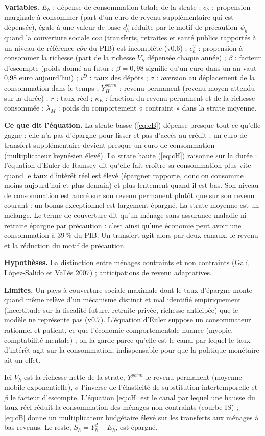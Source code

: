 \documentclass[11pt,a4paper]{article}
\newcommand{\variables}{\par\noindent\textbf{Variables.} }
\newcommand{\sens}{\par\noindent\textbf{Ce que dit l'équation.} }
\newcommand{\hyp}{\par\noindent\textbf{Hypothèses.} }
\newcommand{\limites}{\par\noindent\textbf{Limites.} }
\begin{document}
\begin{lecture}
\variables $E_h$ : dépense de consommation totale de la strate ; $c_h$ : propension marginale à consommer (part d'un euro de revenu supplémentaire qui est dépensée), égale à une valeur de base $c^0_h$ réduite par le motif de précaution $\psi_h$ quand la couverture sociale $cov$ (transferts, retraites et santé publics rapportés à un niveau de référence $\overline{cov}$ du PIB) est incomplète (v0.6) ; $c^V_h$ : propension à consommer la richesse (part de la richesse $V_h$ dépensée chaque année) ; $\beta$ : facteur d'escompte (poids donné au futur ; $\beta=0{,}98$ signifie qu'un euro dans un an vaut 0,98 euro aujourd'hui) ; $i^D$ : taux des dépôts ; $\sigma$ : aversion au déplacement de la consommation dans le temps ; $Y^{perm}_H$ : revenu permanent (revenu moyen attendu sur la durée) ; $r$ : taux réel ; $\kappa_E$ : fraction du revenu permanent et de la richesse consommée ; $\lambda_M$ : poids du comportement « contraint » dans la strate moyenne.
\sens La strate basse (\eqref{eq:cB}) dépense presque tout ce qu'elle gagne : elle n'a pas d'épargne pour lisser et pas d'accès au crédit ; un euro de transfert supplémentaire devient presque un euro de consommation (multiplicateur keynésien élevé). La strate haute (\eqref{eq:cH}) raisonne sur la durée : l'équation d'Euler de Ramsey dit qu'elle fait croître sa consommation plus vite quand le taux d'intérêt réel est élevé (épargner rapporte, donc on consomme moins aujourd'hui et plus demain) et plus lentement quand il est bas. Son niveau de consommation est ancré sur son revenu permanent plutôt que sur son revenu courant : un bonus exceptionnel est largement épargné. La strate moyenne est un mélange. Le terme de couverture dit qu'un ménage sans assurance maladie ni retraite épargne par précaution : c'est ainsi qu'une économie peut avoir une consommation à 39\,\% du PIB. Un transfert agit alors par deux canaux, le revenu et la réduction du motif de précaution.
\hyp La distinction entre ménages contraints et non contraints (Galí, López-Salido et Vallés 2007) ; anticipations de revenu adaptatives.
\limites Un pays à couverture sociale maximale dont le taux d'épargne monte quand même relève d'un mécanisme distinct et mal identifié empiriquement (incertitude sur la fiscalité future, retraite privée, richesse anticipée) que le modèle ne représente pas (v0.7). L'équation d'Euler suppose un consommateur rationnel et patient, ce que l'économie comportementale nuance (myopie, comptabilité mentale) ; on la garde parce qu'elle est le canal par lequel le taux d'intérêt agit sur la consommation, indispensable pour que la politique monétaire ait un effet.
\end{lecture}
Ici $V_h$ est la richesse nette de la strate, $Y^{perm}$ le revenu permanent (moyenne mobile exponentielle), $\sigma$ l'inverse de l'élasticité de substitution intertemporelle et $\beta$ le facteur d'escompte. L'équation \eqref{eq:cH} est le canal par lequel une hausse du taux réel réduit la consommation des ménages non contraints (courbe IS) ; \eqref{eq:cB} donne un multiplicateur budgétaire élevé sur les transferts aux ménages à bas revenus. Le reste, $S_h = Y^d_h - E_h$, est épargné.
\end{document}
